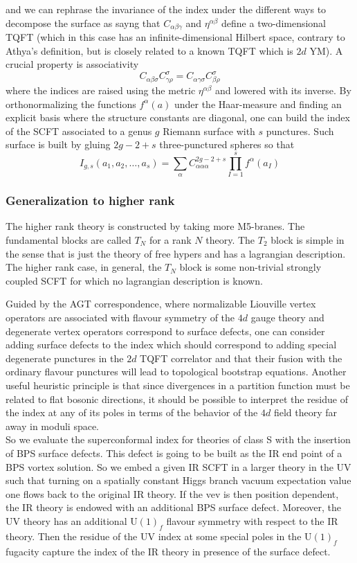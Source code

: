 \documentclass[11pt]{article}
\theoremstyle{definition}
\numberwithin{equation}{section}
\newcommand*\U{\mathrm{U}}
\begin{document}
and we can rephrase the invariance of the index under the different ways to decompose the surface as sayng that $C_{\alpha\beta\gamma}$ and $\eta^{\alpha\beta}$ define a two-dimensional TQFT (which in this case has an infinite-dimensional Hilbert space, contrary to Athya's definition, but is closely related to a known TQFT which is $2d$ YM). A crucial property is associativity
\begin{equation}
	C_{\alpha\beta\sigma}C^{\sigma}_{\gamma\rho}=C_{\alpha\gamma\sigma}C^{\sigma}_{\beta\rho}
\end{equation}
where the indices are raised using the metric $\eta^{\alpha\beta}$ and lowered with its inverse. By orthonormalizing the functions $f^{\alpha}(a)$ under the Haar-measure and finding an explicit basis where the structure constants are diagonal, one can build the index of the SCFT associated to a genus $g$ Riemann surface with $s$ punctures. Such surface is built by gluing $2g-2+s$ three-punctured spheres so that
\begin{equation}
	I_{g,s}(a_{1},a_{2},\ldots,a_{s})=\sum_{\alpha}C_{\alpha\alpha\alpha}^{2g-2+s}\prod_{I=1}^{s}f^{\alpha}(a_{I})
\end{equation}
\subsubsection{Generalization to higher rank}
The higher rank theory is constructed by taking more M5-branes. The fundamental blocks are called $T_{N}$ for a rank $N$ theory. The $T_{2}$ block is simple in the sense that is just the theory of free hypers and has a lagrangian description. The higher rank case, in general, the $T_{N}$ block is some non-trivial strongly coupled SCFT for which no lagrangian description is known.

Guided by the AGT correspondence, where normalizable Liouville vertex operators are associated with flavour symmetry of the $4d$ gauge theory and degenerate vertex operators correspond to surface defects, one can consider adding surface defects to the index which should correspond to adding special degenerate punctures in the $2d$ TQFT correlator and that their fusion with the ordinary flavour punctures will lead to topological bootstrap equations. Another useful heuristic principle is that since divergences in a partition function must be related to flat bosonic directions, it should be possible to interpret the residue of the index at any of its poles in terms of the behavior of the $4d$ field theory far away in moduli space.\\
So we evaluate the superconformal index for theories of class S with the insertion of BPS surface defects. This defect is going to be built as the IR end point of a BPS vortex solution. So we embed a given IR SCFT in a larger theory in the UV such that turning on a spatially constant Higgs branch vacuum expectation value one flows back to the original IR theory. If the vev is then position dependent, the IR theory is endowed with an additional BPS surface defect. Moreover, the UV theory has an additional $\U(1)_{f}$ flavour symmetry with respect to the IR theory. Then the residue of the UV index at some special poles in the $\U(1)_{f}$ fugacity capture the index of the IR theory in presence of the surface defect.
\end{document}
